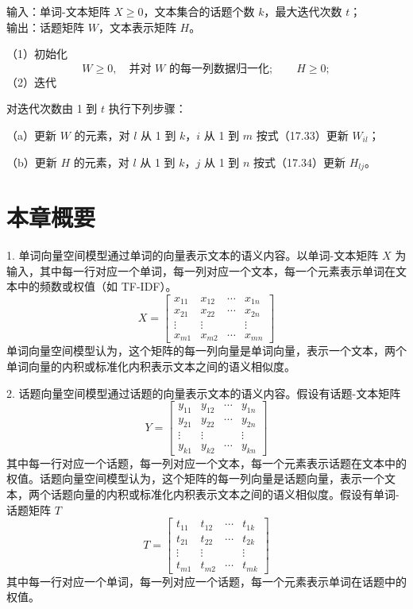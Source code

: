 \documentclass[UTF8,12pt,a4paper,fontset=fandol]{ctexart}
\begin{document}
\noindent 输入：单词-文本矩阵 $X\geqslant 0$，文本集合的话题个数 $k$，最大迭代次数 $t$；\\
输出：话题矩阵 $W$，文本表示矩阵 $H$。

（1）初始化
\[
W\geqslant 0,\quad \text{并对 }W\text{ 的每一列数据归一化};\qquad H\geqslant 0;
\]
（2）迭代

对迭代次数由 1 到 $t$ 执行下列步骤：

（a）更新 $W$ 的元素，对 $l$ 从 1 到 $k$，$i$ 从 1 到 $m$ 按式（17.33）更新 $W_{il}$；

（b）更新 $H$ 的元素，对 $l$ 从 1 到 $k$，$j$ 从 1 到 $n$ 按式（17.34）更新 $H_{lj}$。

\section*{本章概要}

1. 单词向量空间模型通过单词的向量表示文本的语义内容。以单词-文本矩阵 $X$ 为输入，其中每一行对应一个单词，每一列对应一个文本，每一个元素表示单词在文本中的频数或权值（如 TF-IDF）。
\[
X=
\begin{bmatrix}
x_{11} & x_{12} & \cdots & x_{1n}\\
x_{21} & x_{22} & \cdots & x_{2n}\\
\vdots & \vdots & & \vdots\\
x_{m1} & x_{m2} & \cdots & x_{mn}
\end{bmatrix}
\]
单词向量空间模型认为，这个矩阵的每一列向量是单词向量，表示一个文本，两个单词向量的内积或标准化内积表示文本之间的语义相似度。

2. 话题向量空间模型通过话题的向量表示文本的语义内容。假设有话题-文本矩阵
\[
Y=
\begin{bmatrix}
y_{11} & y_{12} & \cdots & y_{1n}\\
y_{21} & y_{22} & \cdots & y_{2n}\\
\vdots & \vdots & & \vdots\\
y_{k1} & y_{k2} & \cdots & y_{kn}
\end{bmatrix}
\]
其中每一行对应一个话题，每一列对应一个文本，每一个元素表示话题在文本中的权值。话题向量空间模型认为，这个矩阵的每一列向量是话题向量，表示一个文本，两个话题向量的内积或标准化内积表示文本之间的语义相似度。假设有单词-话题矩阵 $T$
\[
T=
\begin{bmatrix}
t_{11} & t_{12} & \cdots & t_{1k}\\
t_{21} & t_{22} & \cdots & t_{2k}\\
\vdots & \vdots & & \vdots\\
t_{m1} & t_{m2} & \cdots & t_{mk}
\end{bmatrix}
\]
其中每一行对应一个单词，每一列对应一个话题，每一个元素表示单词在话题中的权值。
\end{document}
